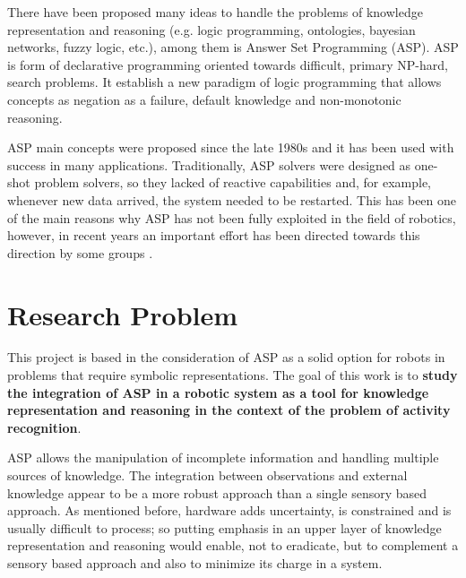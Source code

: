 There have been proposed many ideas to handle the problems of knowledge representation and reasoning (e.g. logic programming, ontologies, bayesian networks, fuzzy logic, etc.), among them is Answer Set Programming (ASP).
ASP is form of declarative programming oriented towards difficult, primary NP-hard, search problems.
It establish a new paradigm of logic programming that allows concepts as negation as a failure, default knowledge and non-monotonic reasoning.

ASP main concepts were proposed since the late 1980s \citep{Gelf88a} and it has been used with success in many applications.
Traditionally, ASP solvers were designed as one-shot problem solvers, so they lacked of reactive capabilities and, for example, whenever new data arrived, the system needed to be restarted.
This has been one of the main reasons why ASP has not been fully exploited in the field of robotics, however, in recent years an important effort has been directed towards this direction by some groups \citep{AndresOSSR13_rosoclingo,Erdem2013_IntLowRTaskP}.


\section{Research Problem}

This project is based in the consideration of ASP as a solid option for robots in problems that require symbolic representations.
The goal of this work is to \textbf{study the integration of ASP in a robotic system as a tool for knowledge representation and reasoning in the context of the problem of activity recognition}.

ASP allows the manipulation of incomplete information and handling multiple sources of knowledge.
The integration between observations and external knowledge appear to be a more robust approach than a single sensory based approach.
As mentioned before, hardware adds uncertainty, is constrained and is usually difficult to process; so putting emphasis in an upper layer of knowledge representation and reasoning would enable, not to eradicate, but to complement a sensory based approach and also to minimize its charge in a system.




